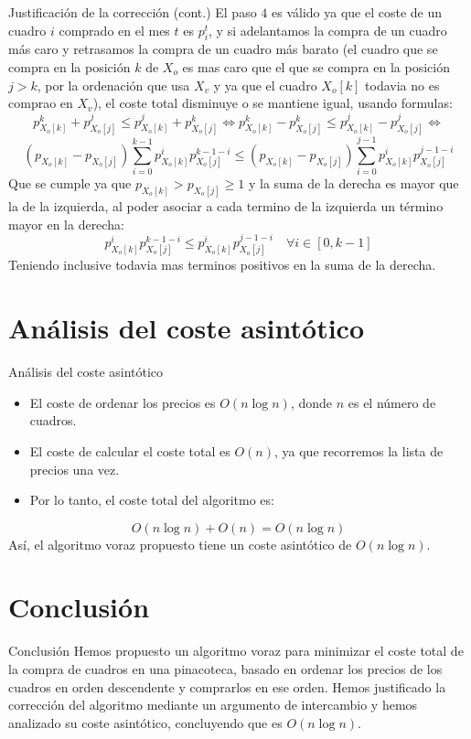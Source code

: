 \documentclass[aspectratio=169]{beamer}
\begin{document}
\begin{frame}{Justificación de la corrección (cont.)}
    El paso $4$ es válido ya que el coste de un cuadro $i$ comprado en el mes $t$ es $p_i^t$, y si adelantamos la compra de un cuadro más caro y retrasamos la compra de un cuadro más barato (el cuadro que se compra en la posición $k$ de $X_o$ es mas caro que el que se compra en la posición $j > k$, por la ordenación que usa $X_v$ y ya que el cuadro $X_o[k]$ todavia no es comprao en $X_v$), el coste total disminuye o se mantiene igual, usando formulas:
    \[
    p_{X_o[k]}^k + p_{X_o[j]}^j \leq p_{X_o[k]}^j + p_{X_o[j]}^k \iff
    p_{X_o[k]}^k - p_{X_o[j]}^k \leq p_{X_o[k]}^j - p_{X_o[j]}^j \iff
    \]
    \[
    (p_{X_o[k]} - p_{X_o[j]}) \sum_{i=0}^{k-1} p_{X_o[k]}^i p_{X_o[j]}^{k-1-i} \leq (p_{X_o[k]} - p_{X_o[j]}) \sum_{i=0}^{j-1} p_{X_o[k]}^i p_{X_o[j]}^{j-1-i}
    \]
    Que se cumple ya que $p_{X_o[k]} > p_{X_o[j]} \geq 1$ y la suma de la derecha es mayor que la de la izquierda, al poder asociar a cada termino de la izquierda un término mayor en la derecha:
    \[
    p_{X_o[k]}^{i} p_{X_o[j]}^{k-1-i} \leq p_{X_o[k]}^{i} p_{X_o[j]}^{j-1-i} \quad \forall i \in [0, k-1]
    \]
    Teniendo inclusive todavia mas terminos positivos en la suma de la derecha.
\end{frame}

\section{Análisis del coste asintótico}
\begin{frame}{Análisis del coste asintótico}
    \begin{itemize}
        \item El coste de ordenar los precios es $O(n \log n)$, donde $n$ es el número de cuadros.
        \item El coste de calcular el coste total es $O(n)$, ya que recorremos la lista de precios una vez.
        \item Por lo tanto, el coste total del algoritmo es:
    \end{itemize}
    \[
    O(n \log n) + O(n) = O(n \log n)
    \]
    Así, el algoritmo voraz propuesto tiene un coste asintótico de $O(n \log n)$.
\end{frame}

\section{Conclusión}
\begin{frame}{Conclusión}
    Hemos propuesto un algoritmo voraz para minimizar el coste total de la compra de cuadros en una pinacoteca, basado en ordenar los precios de los cuadros en orden descendente y comprarlos en ese orden. Hemos justificado la corrección del algoritmo mediante un argumento de intercambio y hemos analizado su coste asintótico, concluyendo que es $O(n \log n)$.
\end{frame}
\end{document}
